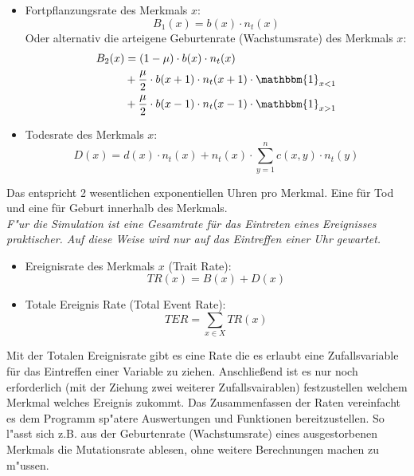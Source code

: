\documentclass[11pt, a4paper, german]{article}
\begin{document}
	\begin{itemize}
		\item Fortpflanzungsrate des Merkmals $ x $: 
		\[ B_1(x) = b(x) \cdot n_t(x) \]
		Oder alternativ die arteigene Geburtenrate (Wachstumsrate) des Merkmals $ x $: 
		\begin{align*}
			B_2(x)  & = (1 - \mu) \cdot b(x) \cdot n_t(x)\\
				  & + \frac{\mu}{2} \cdot b(x+1) \cdot n_t(x+1) \cdot \mathbbm{1}_{x<1}\\
				  & + \frac{\mu}{2} \cdot b(x-1) \cdot n_t(x-1) \cdot \mathbbm{1}_{x>1}
		\end{align*}
		\item Todesrate des Merkmals $ x $: 
		\[ D(x) = d(x) \cdot n_t(x) + n_t(x) \cdot \sum_{y=1}^{n} c(x,y) \cdot n_t(y) \]
	\end{itemize}
	Das entspricht 2 wesentlichen exponentiellen Uhren pro Merkmal. Eine für Tod und eine für Geburt innerhalb des Merkmals.\\
	\textit{F"ur die Simulation ist eine Gesamtrate für das Eintreten eines Ereignisses praktischer. Auf diese Weise wird nur auf das Eintreffen einer Uhr gewartet.}
	\begin{itemize}
		\item Ereignisrate des Merkmals $ x $ (Trait Rate):
		\[ TR(x) = B(x) + D(x) \]
		\item Totale Ereignis Rate (Total Event Rate): 
		\[ TER = \sum_{x \in X} TR(x)\]
	\end{itemize}
	Mit der Totalen Ereignisrate gibt es eine Rate die es erlaubt eine Zufallsvariable für das Eintreffen einer Variable zu ziehen. Anschließend ist es nur noch erforderlich (mit der Ziehung zwei weiterer Zufallsvairablen) festzustellen welchem Merkmal welches Ereignis zukommt. Das Zusammenfassen der Raten vereinfacht es dem Programm sp"atere Auswertungen und Funktionen bereitzustellen. So l"asst sich z.B. aus der Geburtenrate (Wachstumsrate) eines ausgestorbenen Merkmals die Mutationsrate ablesen, ohne weitere Berechnungen machen zu m"ussen.\\
	
\end{document}
